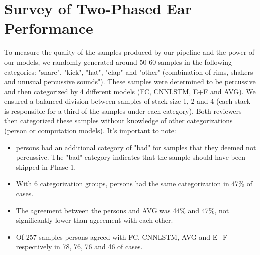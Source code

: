 \documentclass[\main/thesis.tex]{subfiles}
\begin{document}
 \section{Survey of Two-Phased Ear Performance}
\begin{table}[htbp]
\caption{\label{kappa_table}Table of Fleiss' kappa coefficient to measure the degree of agreement between persons (HvH), persons with FC model (H+FC), persons with CNNLSTM model, persons with all models (H+ALL), and the 3 models }
\end{table}
To measure the quality of the samples produced by our pipeline and the power of our models, we randomly generated around 50-60 samples in the following categories: "snare", "kick", "hat", "clap" and "other" (combination of rims, 
shakers and unusual percussive sounds"). These samples were determined to be percussive and then categorized by 4 different models (FC, CNNLSTM, E+F and AVG). We ensured a balanced division between samples of stack size 1, 2 and 4 (each stack is responsible for a third of the samples under each category). Both reviewers then categorized these samples without knowledge of other categorizations (person or computation models). It's important to note:
\begin{itemize}
    \item persons had an additional category of "bad" for samples that they deemed not percussive. The "bad" category indicates that the sample should have been skipped in Phase 1. 
    \item With 6 categorization groups, persons had the same categorization in 47\% of cases.
    \item The agreement between the persons and AVG was 44\% and 47\%, not significantly lower than agreement with each other. 
    \item Of 257 samples persons agreed with FC, CNNLSTM, AVG and E+F respectively in 78, 76, 76 and 46 of cases.
\end{itemize}
\end{document}

